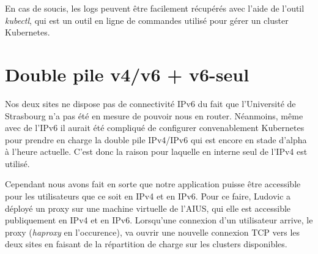 En cas de soucis, les logs peuvent être facilement récupérés avec l'aide
de l'outil \textit{kubectl}, qui est un outil en ligne de commandes
utilisé pour gérer un cluster Kubernetes.

\section{Double pile v4/v6 + v6-seul}

Nos deux sites ne dispose pas de connectivité IPv6 du fait que
l'Université de Strasbourg n'a pas été en mesure de pouvoir nous en
router. Néanmoins, même avec de l'IPv6 il aurait été compliqué de
configurer convenablement Kubernetes pour prendre en charge la double
pile IPv4/IPv6 qui est encore en stade d'alpha à l'heure actuelle. C'est
donc la raison pour laquelle en interne seul de l'IPv4 est utilisé.

Cependant nous avons fait en sorte que notre application puisse être
accessible pour les utilisateurs que ce soit en IPv4 et en IPv6. Pour ce
faire, Ludovic a déployé un proxy sur une machine virtuelle de l'AIUS,
qui elle est accessible publiquement en IPv4 et en IPv6. Lorsqu'une
connexion d'un utilisateur arrive, le proxy (\textit{haproxy} en
l'occurence), va ouvrir une nouvelle connexion TCP vers les deux sites
en faisant de la répartition de charge sur les clusters disponibles.
